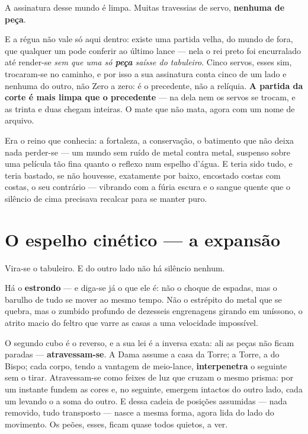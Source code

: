 \documentclass[livro.tex]{subfiles}
\begin{document}
A assinatura desse mundo é limpa. Muitas travessias de servo,
\textbf{nenhuma de peça}.

\medskip

E a régua não vale só aqui dentro: existe uma partida velha, do mundo de fora,
que qualquer um pode conferir ao último lance --- nela o rei preto foi encurralado
até render-se \emph{sem que uma só \textbf{peça} saísse do tabuleiro}. Cinco servos,
esses sim, trocaram-se no caminho, e por isso a sua assinatura conta cinco de um lado e nenhuma do outro, não
Zero a zero: é o precedente, não a relíquia. \textbf{A partida da corte é mais limpa que
o precedente} --- na dela nem os servos se trocam, e as trinta e duas chegam
inteiras. O mate que não mata, agora com um nome de arquivo.

\medskip

Era o reino que \Ben conhecia: a fortaleza, a conservação, o batimento que não
deixa nada perder-se --- um mundo sem ruído de metal contra metal, suspenso sobre uma
película tão fina quanto o reflexo num espelho d'água. E teria sido tudo, e teria
bastado, se não houvesse, exatamente por baixo, encostado costas com costas, o seu
contrário --- vibrando com a fúria escura e o sangue quente que o silêncio de cima
precisava recalcar para se manter puro.

\section{O espelho cinético --- a expansão}

Vira-se o tabuleiro. E do outro lado não há silêncio nenhum.

Há o \textbf{estrondo} --- e diga-se já o que ele é: não o choque de espadas, mas o
barulho de tudo se mover ao mesmo tempo. Não o estrépito do metal que se quebra, mas o
zumbido profundo de dezesseis engrenagens girando em uníssono, o atrito macio do feltro
que varre as casas a uma velocidade impossível.

\medskip

O segundo cubo é o reverso, e a sua lei é a inversa exata: ali as peças não ficam
paradas --- \textbf{atravessam-se}. A Dama assume a casa da Torre; a Torre, a do
Bispo; cada corpo, tendo a vantagem de meio-lance, \textbf{interpenetra} o seguinte
sem o tirar. Atravessam-se como feixes de luz que cruzam o mesmo prisma: por um instante
fundem as cores e, no seguinte, emergem intactos do outro lado, cada um levando o
a soma do outro. E dessa cadeia de posições assumidas --- nada removido, tudo transposto
--- nasce a mesma forma, agora lida do lado do movimento. Os peões, esses, ficam
quase todos quietos, a ver.
\end{document}

